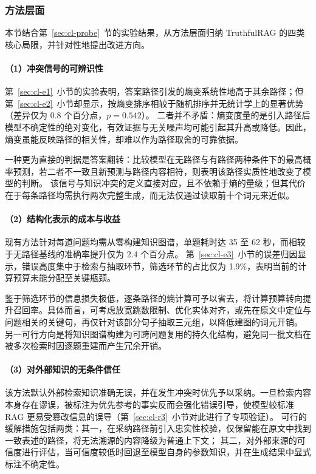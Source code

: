 \subsubsection{方法层面}
\label{sec:cl-discussion-method}

本节结合第~\ref{sec:cl-probe}~节的实验结果，从方法层面归纳 TruthfulRAG 的四类核心局限，并针对性地提出改进方向。

\paragraph{（1）冲突信号的可辨识性}
第~\ref{sec:cl-e1}~小节的实验表明，答案路径引发的熵变系统性地高于其余路径；但第~\ref{sec:cl-e2}~小节却显示，按熵变排序相较于随机排序并无统计学上的显著优势（差异仅为 0.8 个百分点，$p=0.542$）。
二者并不矛盾：熵变度量的是引入路径后模型不确定性的绝对变化，有效证据与无关噪声均可能引起其升高或降低。因此，熵变虽能反映路径的相关性，却难以作为路径取舍的可靠依据。

一种更为直接的判据是答案翻转：比较模型在无路径与有路径两种条件下的最高概率预测，若二者不一致且新预测与路径内容相符，则表明该路径实质性地改变了模型的判断。
该信号与知识冲突的定义直接对应，且不依赖于熵的量级；但其代价在于每条路径均需执行两次完整生成，而无法仅通过读取前十个词元来近似。

\paragraph{（2）结构化表示的成本与收益}
现有方法针对每道问题均需从零构建知识图谱，单题耗时达 35 至 62 秒，而相较于无路径基线的准确率提升仅为 2.4 个百分点。
第~\ref{sec:cl-e3}~小节的误差归因显示，错误高度集中于检索与抽取环节，筛选环节的占比仅为 1.9\%，表明当前的计算预算未能分配至关键瓶颈。

鉴于筛选环节的信息损失极低，逐条路径的熵计算可予以省去，将计算预算转向提升召回率。具体而言，可考虑放宽跳数限制、优化实体对齐，或先在原文中定位与问题相关的关键句，再仅针对该部分句子抽取三元组，以降低建图的词元开销。
另一可行方向是将知识图谱构建为可跨问题复用的持久化结构，避免同一批文档在被多次检索时因逐题重建而产生冗余开销。

\paragraph{（3）对外部知识的无条件信任}
该方法默认外部检索知识准确无误，并在发生冲突时优先予以采纳。一旦检索内容本身存在谬误，被标注为优先参考的事实反而会强化错误引导，使模型较标准 RAG 更易受篡改信息的误导（第~\ref{sec:cl-r3}~小节对此进行了专项验证）。
可行的缓解措施包括两类：其一，在采纳路径前引入忠实性校验，仅保留能在原文中找到一致表述的路径，将无法溯源的内容降级为普通上下文；
其二，对外部来源的可信度进行评估，当可信度较低时回退至模型自身的参数知识，并在生成结果中显式标注不确定性。

